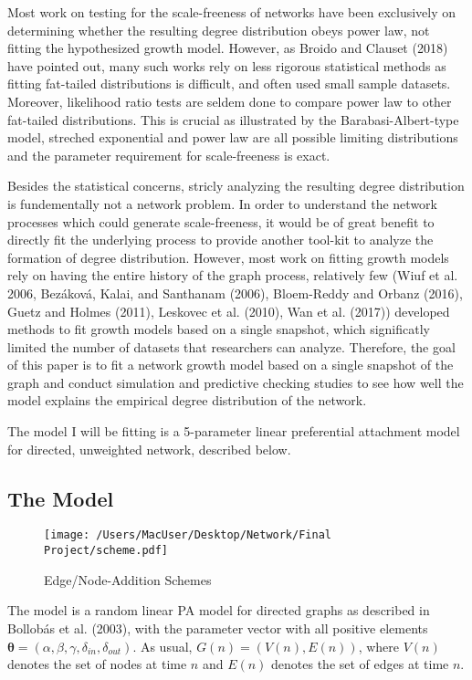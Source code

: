 \documentclass[]{elsarticle} %
\makeatletter
\def\maxwidth{\ifdim\Gin@nat@width>\linewidth\linewidth
\else\Gin@nat@width\fi}
\let\Oldincludegraphics\includegraphics
\renewcommand{\includegraphics}[1]{\Oldincludegraphics[width=\maxwidth]{#1}}
\makeatother
\begin{document}
Most work on testing for the scale-freeness of networks have been
exclusively on determining whether the resulting degree distribution
obeys power law, not fitting the hypothesized growth model. However, as
Broido and Clauset (2018) have pointed out, many such works rely on less
rigorous statistical methods as fitting fat-tailed distributions is
difficult, and often used small sample datasets. Moreover, likelihood
ratio tests are seldem done to compare power law to other fat-tailed
distributions. This is crucial as illustrated by the
Barabasi-Albert-type model, streched exponential and power law are all
possible limiting distributions and the parameter requirement for
scale-freeness is exact.

Besides the statistical concerns, stricly analyzing the resulting degree
distribution is fundementally not a network problem. In order to
understand the network processes which could generate scale-freeness, it
would be of great benefit to directly fit the underlying process to
provide another tool-kit to analyze the formation of degree
distribution. However, most work on fitting growth models rely on having
the entire history of the graph process, relatively few (Wiuf et al.
2006, Bezáková, Kalai, and Santhanam (2006), Bloem-Reddy and Orbanz
(2016), Guetz and Holmes (2011), Leskovec et al. (2010), Wan et al.
(2017)) developed methods to fit growth models based on a single
snapshot, which significatly limited the number of datasets that
researchers can analyze. Therefore, the goal of this paper is to fit a
network growth model based on a single snapshot of the graph and conduct
simulation and predictive checking studies to see how well the model
explains the empirical degree distribution of the network.

The model I will be fitting is a 5-parameter linear preferential
attachment model for directed, unweighted network, described below.

\subsection{The Model}\label{the-model}

\begin{figure}[htbp]
\centering
\texttt{[image: /Users/MacUser/Desktop/Network/Final Project/scheme.pdf]}
\caption{Edge/Node-Addition Schemes}
\end{figure}

The model is a random linear PA model for directed graphs as described
in Bollobás et al. (2003), with the parameter vector with all positive
elements
\(\boldsymbol{\theta} = (\alpha, \beta, \gamma, \delta_{in}, \delta_{out})\).
As usual, \(G(n) = (V(n), E(n))\), where \(V(n)\) denotes the set of
nodes at time \(n\) and \(E(n)\) denotes the set of edges at time \(n\).
\end{document}
